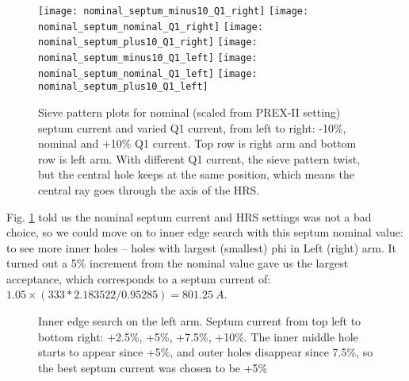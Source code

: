 \begin{figure}[H]
    \centering
    \texttt{[image: nominal\_septum\_minus10\_Q1\_right]}
    \texttt{[image: nominal\_septum\_nominal\_Q1\_right]}
    \texttt{[image: nominal\_septum\_plus10\_Q1\_right]}
    \texttt{[image: nominal\_septum\_minus10\_Q1\_left]}
    \texttt{[image: nominal\_septum\_nominal\_Q1\_left]}
    \texttt{[image: nominal\_septum\_plus10\_Q1\_left]}
    \caption{Sieve pattern plots for nominal (scaled from PREX-II setting) septum current
    and varied Q1 current, from left to right: -10\%, nominal and +10\% Q1 current.
    Top row is right arm and bottom row is left arm. With different Q1 current,
    the sieve pattern twist, but the central hole keeps at the same position, 
    which means the central ray goes through the axis of the HRS.}
    \label{fig:central_ray_1}
\end{figure}

Fig. \ref{fig:central_ray_1} told us the nominal septum current and HRS settings was not a bad choice,
so we could move on to inner edge search with this septum nominal value: to
see more inner holes -- holes with largest (smallest) phi in Left (right) arm.
It turned out a 5\% increment from the nominal value gave us the largest 
acceptance, which corresponds to a septum current of: $1.05 \times (333*2.183522/0.95285) = 801.25 \ A$.
\begin{figure}[H]
    \caption{Inner edge search on the left arm. Septum current from top left
    to bottom right: +2.5\%, +5\%, +7.5\%, +10\%. The inner middle hole starts
    to appear since +5\%, and outer holes disappear since 7.5\%, so the best
    septum current was chosen to be +5\%}
\end{figure}

